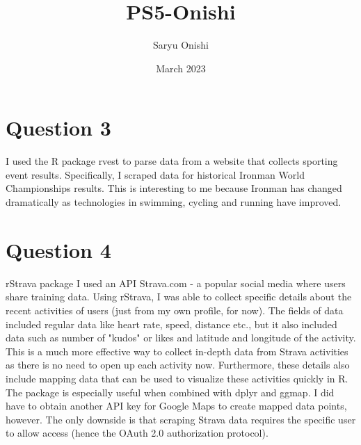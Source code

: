 \documentclass{article}
\title{PS5-Onishi}
\author{Saryu Onishi}
\date{March 2023}
\begin{document}
\maketitle
\section{Question 3}
I used the R package rvest to parse data from a website that collects sporting event results. Specifically, I scraped data for historical Ironman World Championships results. This is interesting to me because Ironman has changed dramatically as technologies in swimming, cycling and running have improved. 

\section{Question 4}
rStrava package
I used an API Strava.com - a popular social media where users share training data.  Using rStrava, I was able to collect specific details about the recent activities of users (just from my own profile, for now). The fields of data included regular data like heart rate, speed, distance etc., but it also included data such as number of "kudos" or likes and latitude and longitude of the activity.
This is a much more effective way to collect in-depth data from Strava activities as there is no need to open up each activity now. Furthermore, these details also include mapping data that can be used to visualize these activities quickly in R.  
The package is especially useful when combined with dplyr and ggmap. I did have to obtain another API key for Google Maps to create mapped data points, however. 
The only downside is that scraping Strava data requires the specific user to allow access (hence the OAuth 2.0 authorization protocol).
\end{document}
